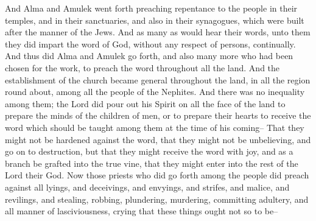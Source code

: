 And Alma and Amulek went forth preaching repentance to the people in their temples, and in their sanctuaries, and also in their synagogues, which were built after the manner of the Jews.
\bverse \iffalse And as many as would hear their words, unto them they did impart the word of God, without any respect of persons, continually. \fi
And as many as would hear their words, unto them they did impart the word of God, without any respect of persons, continually.
\bverse \iffalse And thus did Alma and Amulek go forth, and also many more who had been chosen for the work, to preach the word throughout all the land. And the establishment of the church became general throughout the land, in all the region round about, among all the people of the Nephites. \fi
And thus did Alma and Amulek go forth, and also many more who had been chosen for the work, to preach the word throughout all the land. And the establishment of the church became general throughout the land, in all the region round about, among all the people of the Nephites.
\bverse \iffalse And there was no inequality among them; the Lord did pour out his Spirit on all the face of the land to prepare the minds of the children of men, or to prepare their hearts to receive the word which should be taught among them at the time of his coming-- \fi
And there was no inequality among them; the Lord did pour out his Spirit on all the face of the land to prepare the minds of the children of men, or to prepare their hearts to receive the word which should be taught among them at the time of his coming--
\bverse \iffalse That they might not be hardened against the word, that they might not be unbelieving, and go on to destruction, but that they might receive the word with joy, and as a branch be grafted into the true vine, that they might enter into the rest of the Lord their God. \fi
That they might not be hardened against the word, that they might not be unbelieving, and go on to destruction, but that they might receive the word with joy, and as a branch be grafted into the true vine, that they might enter into the rest of the Lord their God.
\bverse \iffalse Now those priests who did go forth among the people did preach against all lyings, and deceivings, and envyings, and strifes, and malice, and revilings, and stealing, robbing, plundering, murdering, committing adultery, and all manner of lasciviousness, crying that these things ought not so to be-- \fi
Now those priests who did go forth among the people did preach against all lyings, and deceivings, and envyings, and strifes, and malice, and revilings, and stealing, robbing, plundering, murdering, committing adultery, and all manner of lasciviousness, crying that these things ought not so to be--
